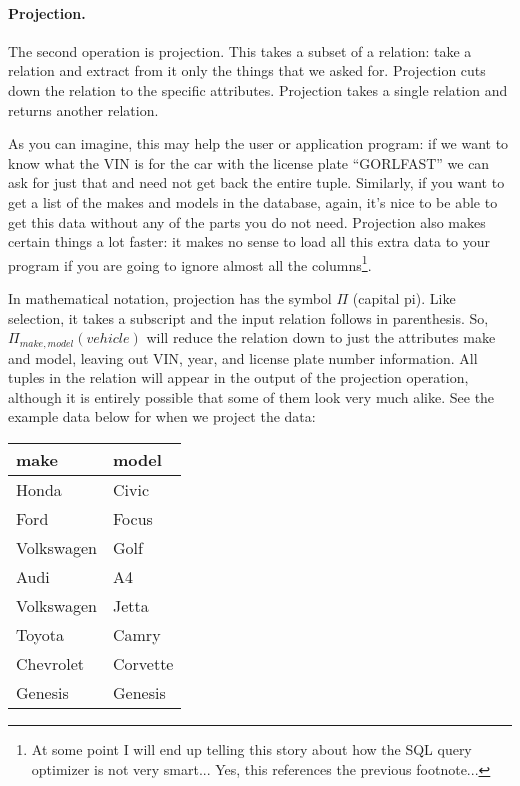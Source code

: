 \documentclass[a4paper]{report}
\begin{document}
\paragraph{Projection.} The second operation is projection. This takes a subset of a relation: take a relation and extract from it only the things that we asked for. Projection cuts down the relation to the specific attributes. Projection takes a single relation and returns another relation.

As you can imagine, this may help the user or application program: if we want to know what the VIN is for the car with the license plate ``GORLFAST'' we can ask for just that and need not get back the entire tuple. Similarly, if you want to get a list of the makes and models in the database, again, it's nice to be able to get this data without any of the parts you do not need. Projection also makes certain things a lot faster: it makes no sense to load all this extra data to your program if you are going to ignore almost all the columns\footnote{At some point I will end up telling this story about how the SQL query optimizer is not very smart... Yes, this references the previous footnote...}.

In mathematical notation, projection has the symbol $\Pi$ (capital pi). Like selection, it takes a subscript and the input relation follows in parenthesis. So, $\Pi_{make, model}( vehicle )$ will reduce the relation down to just the attributes make and model, leaving out VIN, year, and license plate number information. All tuples in the relation will appear in the output of the projection operation, although it is entirely possible that some of them look very much alike. See the example data below for when we project the data:

\begin{center}
\begin{tabular}{|l|l|} \hline
\textbf{make} & \textbf{model} \\ \hline
	Honda & Civic \\ \hline
	Ford & Focus \\ \hline
	Volkswagen & Golf \\ \hline
	Audi & A4  \\ \hline
	Volkswagen & Jetta  \\ \hline
	Toyota & Camry \\ \hline
	Chevrolet & Corvette \\ \hline
	Genesis & Genesis \\ \hline
\end{tabular}
\end{center}
\end{document}
